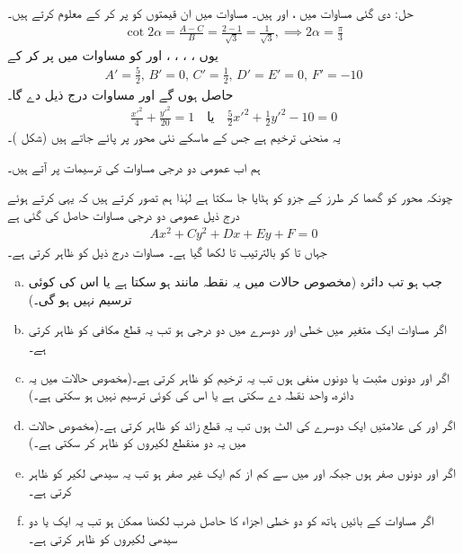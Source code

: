 حل:\quad
دی گئی مساوات میں ،  اور  ہیں۔ مساوات  میں ان قیمتوں کو پر کر کے  معلوم کرتے ہیں۔
\begin{align*}
\cot2\alpha=\frac{A-C}{B}=\frac{2-1}{\sqrt{3}}=\frac{1}{\sqrt{3}},\implies 2\alpha=\frac{\pi}{3}
\end{align*}
یوں ، ، ، ،  اور  کو مساوات  میں پر کر کے
\begin{align*}
A'=\frac{5}{2},\, B'=0,\, C'=\frac{1}{2},\, D'=E'=0,\, F'=-10
\end{align*}
حاصل ہوں گے اور مساوات  درج ذیل دے گا۔
\begin{align*}
\frac{x'^2}{4}+\frac{y'^2}{20}=1\quad \text{یا}\quad \frac{5}{2}x'^2+\frac{1}{2}y'^2-10=0
\end{align*}
یہ منحنی ترخیم ہے جس کے ماسکے نئی  محور پر پائے جاتے ہیں (شکل )۔

ہم اب عمومی دو درجی مساوات کی ترسیمات پر آتے ہیں۔

چونکہ محور کو گھما کر  طرز کے جزو کو ہٹایا جا سکتا ہے لہٰذا ہم تصور کرتے ہیں کہ یہی کرتے ہوئے درج ذیل عمومی دو درجی مساوات حاصل کی گئی ہے
\begin{align}\label{مساوات_مخروط_عمومی_سادہ_دو_درجی_الف}
Ax^2+Cy^2+Dx+Ey+F=0
\end{align}
جہاں  تا  کو بالترتیب  تا  لکھا گیا ہے۔ مساوات  درج ذیل کو ظاہر کرتی ہے۔
\begin{enumerate}[a.]
\item
جب  ہو تب دائرہ (مخصوص حالات میں یہ نقطہ مانند ہو سکتا ہے یا اس کی کوئی ترسیم نہیں ہو گی۔)
\item
اگر مساوات  ایک متغیر میں خطی اور دوسرے میں دو درجی ہو تب یہ قطع مکافی کو ظاہر کرتی ہے۔ 
\item
اگر  اور  دونوں مثبت یا دونوں منفی ہوں تب یہ ترخیم کو ظاہر کرتی ہے۔(مخصوص حالات میں یہ دائرہ، واحد نقطہ دے سکتی ہے یا اس کی کوئی ترسیم نہیں ہو سکتی ہے۔)
\item
اگر  اور  کی علامتیں ایک دوسرے کی الٹ ہوں تب یہ قطع زائد کو ظاہر کرتی ہے۔(مخصوص حالات میں یہ دو منقطع لکیروں کو ظاہر کر سکتی ہے۔)
\item
اگر اور  دونوں صفر ہوں جبکہ  اور  میں سے کم از کم ایک غیر صفر ہو تب یہ سیدھی لکیر کو ظاہر کرتی ہے۔
\item
اگر مساوات  کے بائیں ہاتھ کو دو خطی اجزاء کا حاصل ضرب لکھنا ممکن ہو تب یہ ایک یا دو سیدھی لکیروں کو ظاہر کرتی ہے۔
\end{enumerate}


